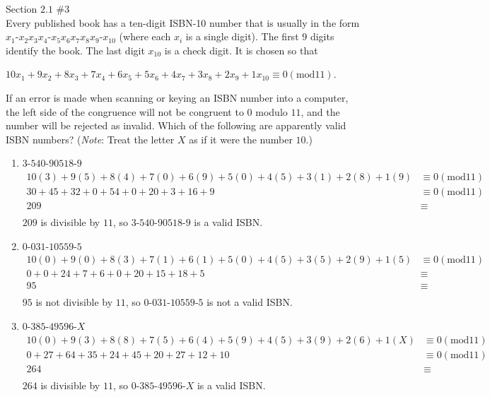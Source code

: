 \documentclass[12pt]{article}
\newenvironment{problem}[2][Problem]{\begin{trivlist}
\item[\hskip \labelsep {\bfseries #1}\hskip \labelsep {\bfseries #2.}]}{\end{trivlist}}
\begin{document}
\begin{problem}{2} Section $2.1$ $\#3$ \\

\noindent
Every published book has a ten-digit ISBN-10 number that is usually in the form $x_1$-$x_2x_3x_4$-$x_5x_6x_7x_8x_9$-$x_{10}$ (where each $x_i$ is a single digit). The first $9$ digits identify the book. The last digit $x_{10}$ is a check digit. It is chosen so that
\begin{center}
$10x_1+9x_2+8x_3+7x_4+6x_5+5x_6+4x_7+3x_8+2x_9+1x_{10} \equiv 0 (\text{mod}11)$.
\end{center}
\noindent
If an error is made when scanning or keying an ISBN number into a computer, the left side of the congruence will not be congruent to $0$ modulo $11$, and the number will be rejected as invalid. Which of the following are apparently valid ISBN numbers? (\textit{Note}: Treat the letter $X$ as if it were the number $10$.)
\begin{enumerate}[=(\alph*)]
\item $3$-$540$-$90518$-$9$
\begin{align*}
10(3)+9(5)+8(4)+7(0)+6(9)+5(0)+4(5)+3(1)+2(8)+1(9) & \equiv 0 (\text{mod}11) \\
30+45+32+0+54+0+20+3+16+9 & \equiv 0 (\text{mod}11) \\
209 & \equiv \\
\end{align*}
\noindent
$209$ is divisible by $11$, so $3$-$540$-$90518$-$9$ is a valid ISBN.

\item $0$-$031$-$10559$-$5$
\begin{align*}
10(0)+9(0)+8(3)+7(1)+6(1)+5(0)+4(5)+3(5)+2(9)+1(5) & \equiv 0 (\text{mod}11) \\
0+0+24+7+6+0+20+15+18+5 & \equiv \\
95 & \equiv \\
\end{align*}
\noindent
$95$ is not divisible by $11$, so $0$-$031$-$10559$-$5$ is not a valid ISBN.

\item $0$-$385$-$49596$-$X$
\begin{align*}
10(0)+9(3)+8(8)+7(5)+6(4)+5(9)+4(5)+3(9)+2(6)+1(X) & \equiv 0 (\text{mod}11) \\
0+27+64+35+24+45+20+27+12+10 & \equiv 0 (\text{mod}11) \\
264 & \equiv \\
\end{align*}
\noindent
$264$ is divisible by $11$, so $0$-$385$-$49596$-$X$ is a valid ISBN.

\end{enumerate}
\end{problem}
\end{document}
